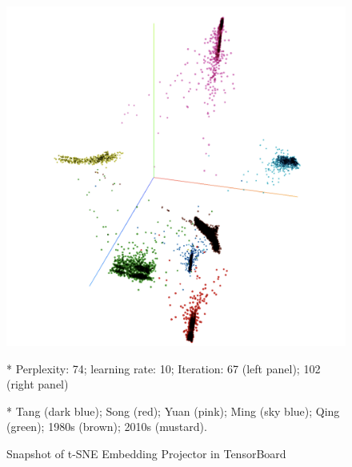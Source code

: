 \begin{figure}[H]
\begin{threeparttable}
\begin{minipage}[b]{0.45\linewidth}
    \includegraphics[width=\textwidth]{figures_new/from_old/tsne_embedding_projector_102}
  \end{minipage}
    \begin{tablenotes}
      \linespread{1}\footnotesize
      \item[*]\hspace*{-\fontdimen2\font}Perplexity: 74; learning rate: 10; Iteration: 67 (left panel); 102 (right panel)
      \item[*]\hspace*{-\fontdimen2\font}Tang (dark blue); Song (red); Yuan (pink); Ming (sky blue); Qing (green); 1980s (brown); 2010s (mustard).
    \end{tablenotes}
  \end{threeparttable}
  \caption{Snapshot of t-SNE Embedding Projector in TensorBoard}
\end{figure}

